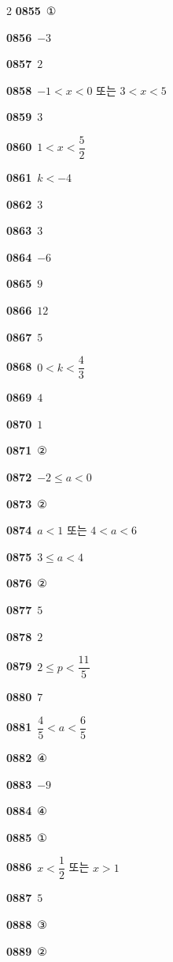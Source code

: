 \documentclass[10pt,a4paper]{article}
\begin{document}
\begin{multicols}{2}
\noindent\textbf{0855}\ ①\par
\noindent\textbf{0856}\ $-3$\par
\noindent\textbf{0857}\ $2$\par
\noindent\textbf{0858}\ $-1<x<0$ 또는 $3<x<5$\par
\noindent\textbf{0859}\ $3$\par
\noindent\textbf{0860}\ $1<x<\dfrac{5}{2}$\par
\noindent\textbf{0861}\ $k<-4$\par
\noindent\textbf{0862}\ $3$\par
\noindent\textbf{0863}\ $3$\par
\noindent\textbf{0864}\ $-6$\par
\noindent\textbf{0865}\ $9$\par
\noindent\textbf{0866}\ $12$\par
\noindent\textbf{0867}\ $5$\par
\noindent\textbf{0868}\ $0<k<\dfrac{4}{3}$\par
\noindent\textbf{0869}\ $4$\par
\noindent\textbf{0870}\ $1$\par
\noindent\textbf{0871}\ ②\par
\noindent\textbf{0872}\ $-2\le a<0$\par
\noindent\textbf{0873}\ ②\par
\noindent\textbf{0874}\ $a<1$ 또는 $4<a<6$\par
\noindent\textbf{0875}\ $3\le a<4$\par
\noindent\textbf{0876}\ ②\par
\noindent\textbf{0877}\ $5$\par
\noindent\textbf{0878}\ $2$\par
\noindent\textbf{0879}\ $2\le p<\dfrac{11}{5}$\par
\noindent\textbf{0880}\ $7$\par
\noindent\textbf{0881}\ $\dfrac{4}{5}<a<\dfrac{6}{5}$\par
\noindent\textbf{0882}\ ④\par
\noindent\textbf{0883}\ $-9$\par
\noindent\textbf{0884}\ ④\par
\noindent\textbf{0885}\ ①\par
\noindent\textbf{0886}\ $x<\dfrac{1}{2}$ 또는 $x>1$\par
\noindent\textbf{0887}\ $5$\par
\noindent\textbf{0888}\ ③\par
\noindent\textbf{0889}\ ②\par

\end{multicols}
\end{document}
